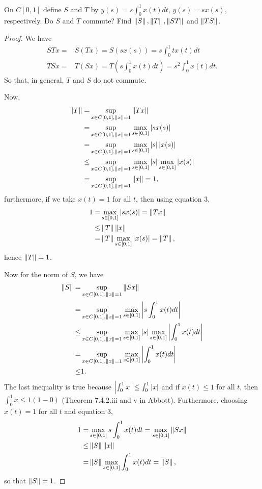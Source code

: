 \begin{exercise}{10}
On $C[0,1]$ define $S$ and $T$ by $y(s)=s\int_0^1x(t)dt$, $y(s)=sx(s)$, respectively. 
Do $S$ and $T$ commute? 
Find $\left\lVert S\right\rVert, \left\lVert T\right\rVert, \left\lVert ST\right\rVert$ and $\left\lVert TS\right\rVert$.
\end{exercise}
\begin{proof}
We have 
\begin{align*}
    STx 
    =& S(Tx) = S(sx(s)) = s\int_0^1 tx(t) dt\\
    TSx =& T(Sx) = T(s\int_0^1 x(t) dt) = s^2\int_0^1 x(t)dt.
\end{align*}
So that, in general, $T$ and $S$ do not commute.

Now,
\begin{align*}
    \left\lVert T\right\rVert 
    =& \sup_{x\in C[0,1], \left\lVert x\right\rVert=1} \left\lVert Tx\right\rVert\\
    =& \sup_{x\in C[0,1], \left\lVert x\right\rVert=1} \max_{s\in [0,1]}\left\lvert sx(s)\right\rvert\\
    =& \sup_{x\in C[0,1], \left\lVert x\right\rVert=1} \max_{s\in [0,1]}\left\lvert s\right\rvert\left\lvert x(s)\right\rvert\\
    \leq& \sup_{x\in C[0,1], \left\lVert x\right\rVert=1} \max_{s\in [0,1]}\left\lvert s\right\rvert\max_{s\in [0,1]}\left\lvert x(s)\right\rvert\\
    =& \sup_{x\in C[0,1], \left\lVert x\right\rVert=1}\left\lVert x\right\rVert =1,
\end{align*}
furthermore, if we take $x(t)=1$ for all $t$, then using equation 3,
\begin{align*}
    1 
    =& \max_{s\in [0,1]}\left\lvert sx(s)\right\rvert
    = \left\lVert Tx\right\rVert\\
    \leq& \left\lVert T\right\rVert\left\lVert x\right\rVert\\
    =& \left\lVert T\right\rVert\max_{s\in[0,1]}\left\lvert x(s)\right\rvert =\left\lVert T\right\rVert, 
\end{align*}
hence $\left\lVert T\right\rVert=1$.

Now for the norm of $S$, we have
\begin{align*}
    \left\lVert S\right\rVert 
    =& \sup_{x\in C[0,1], \left\lVert x\right\rVert=1}\left\lVert Sx\right\rVert\\
    =& \sup_{x\in C[0,1], \left\lVert x\right\rVert=1} \max_{s\in[0,1]}\left\lvert s\int_0^1x(t)dt\right\rvert\\
    \leq& \sup_{x\in C[0,1], \left\lVert x\right\rVert=1} \max_{s\in[0,1]}\left\lvert s\right\rvert \max_{s\in[0,1]}\left\lvert \int_0^1x(t)dt\right\rvert\\
    =& \sup_{x\in C[0,1], \left\lVert x\right\rVert=1} \max_{s\in[0,1]}\left\lvert \int_0^1x(t)dt\right\rvert\\
    \leq& 1.
\end{align*}
The last inequality is true because $\left\lvert \int_0^1 x\right\rvert\leq \int_0^1 \left\lvert x\right\rvert$ and if $x(t)\leq 1$ for all $t$, then $\int_0^1x\leq 1(1-0)$ (Theorem 7.4.2.iii and v in Abbott).
Furthermore, choosing $x(t)=1$ for all $t$ and equation 3,
\begin{align*}
    1 =& \max_{s\in[0,1]}s\int_0^1x(t)dt
    = \max_{s\in[0,1]}\left\lVert Sx\right\rVert\\
    \leq& \left\lVert S\right\rVert\left\lVert x\right\rVert\\
    =& \left\lVert S\right\rVert\max_{s\in[0,1]}\int_0^1x(t)dt =\left\lVert S\right\rVert,
\end{align*}
so that $\left\lVert S\right\rVert=1$.


\end{proof}
